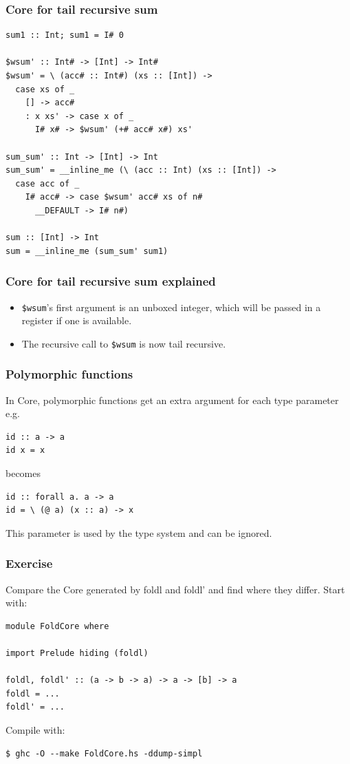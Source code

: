 \documentclass{beamer}
\begin{document}
\begin{frame}[fragile]
  \frametitle{Core for tail recursive sum}

  \begin{verbatim}
sum1 :: Int; sum1 = I# 0

$wsum' :: Int# -> [Int] -> Int#
$wsum' = \ (acc# :: Int#) (xs :: [Int]) ->
  case xs of _
    [] -> acc#
    : x xs' -> case x of _
      I# x# -> $wsum' (+# acc# x#) xs'

sum_sum' :: Int -> [Int] -> Int
sum_sum' = __inline_me (\ (acc :: Int) (xs :: [Int]) ->
  case acc of _
    I# acc# -> case $wsum' acc# xs of n#
      __DEFAULT -> I# n#)
 
sum :: [Int] -> Int
sum = __inline_me (sum_sum' sum1)
  \end{verbatim}
\end{frame}

\begin{frame}[fragile]
  \frametitle{Core for tail recursive sum explained}

  \begin{itemize}
  \item \texttt{\$wsum}'s first argument is an unboxed integer, which
    will be passed in a register if one is available.
  \item The recursive call to \texttt{\$wsum} is now tail recursive.
  \end{itemize}
\end{frame}

\begin{frame}[fragile]
  \frametitle{Polymorphic functions}

  In Core, polymorphic functions get an extra argument for each type
  parameter e.g.

\begin{lstlisting}
id :: a -> a
id x = x
\end{lstlisting}

  becomes

\begin{verbatim}
id :: forall a. a -> a
id = \ (@ a) (x :: a) -> x
\end{verbatim}

  This parameter is used by the type system and can be ignored.
\end{frame}

\begin{frame}[fragile]
  \frametitle{Exercise}

  Compare the Core generated by foldl and foldl' and find where they
  differ.  Start with:

  \begin{lstlisting}
module FoldCore where

import Prelude hiding (foldl)

foldl, foldl' :: (a -> b -> a) -> a -> [b] -> a
foldl = ...
foldl' = ...
  \end{lstlisting}

  Compile with:
  \begin{verbatim}
$ ghc -O --make FoldCore.hs -ddump-simpl
  \end{verbatim}
\end{frame}
\end{document}
